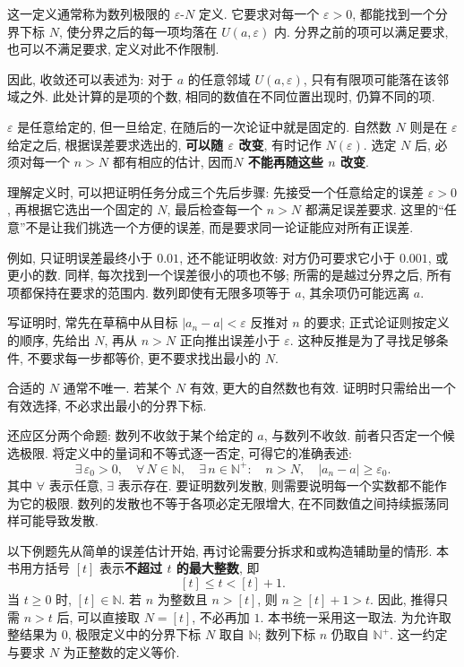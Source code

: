 \documentclass[UTF8,openany]{ctexbook}
\theoremstyle{chinesetextbook}
\begin{document}
这一定义通常称为数列极限的 $\varepsilon$-$N$ 定义. 它要求对每一个 $\varepsilon>0$, 都能找到一个分界下标 $N$, 使分界之后的每一项均落在 $U(a,\varepsilon)$ 内. 分界之前的项可以满足要求, 也可以不满足要求, 定义对此不作限制.

因此, 收敛还可以表述为: 对于 $a$ 的任意邻域 $U(a,\varepsilon)$, 只有有限项可能落在该邻域之外. 此处计算的是项的个数, 相同的数值在不同位置出现时, 仍算不同的项.

$\varepsilon$ 是任意给定的, 但一旦给定, 在随后的一次论证中就是固定的. 自然数 $N$ 则是在 $\varepsilon$ 给定之后, 根据误差要求选出的, \textbf{可以随 $\varepsilon$ 改变}, 有时记作 $N(\varepsilon)$. 选定 $N$ 后, 必须对每一个 $n>N$ 都有相应的估计, 因而\textbf{$N$ 不能再随这些 $n$ 改变}.

理解定义时, 可以把证明任务分成三个先后步骤: 先接受一个任意给定的误差 $\varepsilon>0$, 再根据它选出一个固定的 $N$, 最后检查每一个 $n>N$ 都满足误差要求. 这里的“任意”不是让我们挑选一个方便的误差, 而是要求同一论证能应对所有正误差.

例如, 只证明误差最终小于 $0.01$, 还不能证明收敛: 对方仍可要求它小于 $0.001$, 或更小的数. 同样, 每次找到一个误差很小的项也不够; 所需的是越过分界之后, 所有项都保持在要求的范围内. 数列即使有无限多项等于 $a$, 其余项仍可能远离 $a$.

写证明时, 常先在草稿中从目标 $|a_n-a|<\varepsilon$ 反推对 $n$ 的要求; 正式论证则按定义的顺序, 先给出 $N$, 再从 $n>N$ 正向推出误差小于 $\varepsilon$. 这种反推是为了寻找足够条件, 不要求每一步都等价, 更不要求找出最小的 $N$.

合适的 $N$ 通常不唯一. 若某个 $N$ 有效, 更大的自然数也有效. 证明时只需给出一个有效选择, 不必求出最小的分界下标.

还应区分两个命题: 数列不收敛于某个给定的 $a$, 与数列不收敛. 前者只否定一个候选极限. 将定义中的量词和不等式逐一否定, 可得它的准确表述:
\[
\exists\,\varepsilon_0>0,\quad
\forall\,N\in\mathbb N,\quad
\exists\,n\in\mathbb N^+:\quad
n>N,\quad |a_n-a|\ge\varepsilon_0.
\]
其中 $\forall$ 表示任意, $\exists$ 表示存在. 要证明数列发散, 则需要说明每一个实数都不能作为它的极限. 数列的发散也不等于各项必定无限增大, 在不同数值之间持续振荡同样可能导致发散.

以下例题先从简单的误差估计开始, 再讨论需要分拆求和或构造辅助量的情形. 本书用方括号 $[t]$ 表示\textbf{不超过 $t$ 的最大整数}, 即
\[
[t]\le t<[t]+1.
\]
当 $t\ge0$ 时, $[t]\in\mathbb N$. 若 $n$ 为整数且 $n>[t]$, 则 $n\ge[t]+1>t$. 因此, 推得只需 $n>t$ 后, 可以直接取 $N=[t]$, 不必再加 $1$. 本书统一采用这一取法. 为允许取整结果为 $0$, 极限定义中的分界下标 $N$ 取自 $\mathbb N$; 数列下标 $n$ 仍取自 $\mathbb N^+$. 这一约定与要求 $N$ 为正整数的定义等价.
\end{document}
